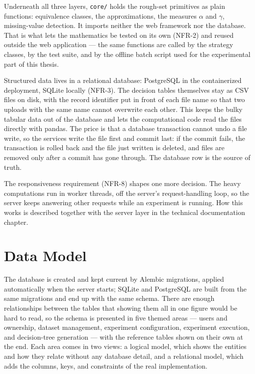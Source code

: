 Underneath all three layers, \texttt{core/} holds the rough-set primitives as plain functions: equivalence classes, the approximations, the measures $\alpha$ and $\gamma$, missing-value detection. It imports neither the web framework nor the database. That is what lets the mathematics be tested on its own (NFR-2) and reused outside the web application --- the same functions are called by the strategy classes, by the test suite, and by the offline batch script used for the experimental part of this thesis.

Structured data lives in a relational database: PostgreSQL in the containerized deployment, SQLite locally (NFR-3). The decision tables themselves stay as CSV files on disk, with the record identifier put in front of each file name so that two uploads with the same name cannot overwrite each other. This keeps the bulky tabular data out of the database and lets the computational code read the files directly with pandas. The price is that a database transaction cannot undo a file write, so the services write the file first and commit last: if the commit fails, the transaction is rolled back and the file just written is deleted, and files are removed only after a commit has gone through. The database row is the source of truth.

The responsiveness requirement (NFR-8) shapes one more decision. The heavy computations run in worker threads, off the server's request-handling loop, so the server keeps answering other requests while an experiment is running. How this works is described together with the server layer in the technical documentation chapter.

\section{Data Model}

The database is created and kept current by Alembic migrations, applied automatically when the server starts; SQLite and PostgreSQL are built from the same migrations and end up with the same schema. There are enough relationships between the tables that showing them all in one figure would be hard to read, so the schema is presented in five themed areas --- users and ownership, dataset management, experiment configuration, experiment execution, and decision-tree generation --- with the reference tables shown on their own at the end. Each area comes in two views: a logical model, which shows the entities and how they relate without any database detail, and a relational model, which adds the columns, keys, and constraints of the real implementation.

